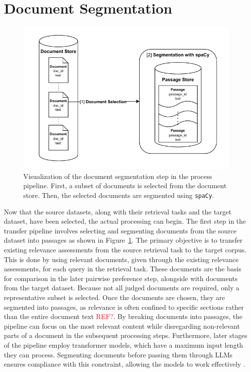 \section{Document Segmentation}\label{document-segmentation}

\begin{figure}[t]
    \centering
    \includegraphics[width=\textwidth]{./graphics/drawio/document_segmentation.pdf}
    \caption{Visualization of the document segmentation step in the process pipeline. First, a subset of documents is selected from the document store. Then, the selected documents are segmented using \texttt{spaCy}.}
    \label{fig:document-segmentation}
\end{figure}

Now that the source datasets, along with their retrieval tasks and the target dataset, have been selected, the actual processing can begin. The first step in the transfer pipeline involves selecting and segmenting documents from the source dataset into passages as shown in Figure~\ref{fig:document-segmentation}. The primary objective is to transfer existing relevance assessments from the source retrieval task to the target corpus. This is done by using relevant documents, given through the existing relevance assessments, for each query in the retrieval task. These documents are the basis for comparison in the later pairwise preference step, alongside with documents from the target dataset. Because not all judged documents are required, only a representative subset is selected. Once the documents are chosen, they are segmented into passages, as relevance is often confined to specific sections rather than the entire document text \textcolor{red}{REF?}. By breaking documents into passages, the pipeline can focus on the most relevant content while disregarding non-relevant parts of a document in the subsequent processing steps. Furthermore, later stages of the pipeline employ transformer models, which have a maximum input length they can process. Segmenting documents before passing them through LLMs ensures compliance with this constraint, allowing the models to work effectively \citep{levy:2024}.

